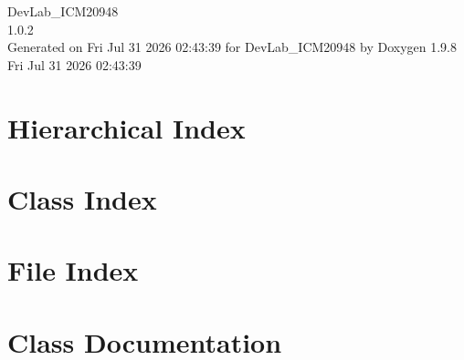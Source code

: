 \documentclass[twoside]{book}
\newcommand{\+}{\discretionary{\mbox{\scriptsize$\hookleftarrow$}}{}{}}
\newcommand{\clearemptydoublepage}{%
    \newpage{\pagestyle{empty}\cleardoublepage}%
  }
\begin{document}
  \raggedbottom
    \hypersetup{pageanchor=false,
                bookmarksnumbered=true,
                pdfencoding=unicode
               }
  \begin{titlepage}
  \vspace*{7cm}
  \begin{center}%
  {\Large Dev\+Lab\+\_\+\+ICM20948}\\
  [1ex]\large 1.\+0.\+2 \\
  \vspace*{1cm}
  {\large Generated on Fri Jul 31 2026 02\+:43\+:39 for Dev\+Lab\+\_\+\+ICM20948 by Doxygen 1.9.8}\\
    \vspace*{0.5cm}
    {\small Fri Jul 31 2026 02:43:39}
  \end{center}
  \end{titlepage}
  \clearemptydoublepage
  \tableofcontents
  \clearemptydoublepage
  \hypersetup{pageanchor=true}

\chapter{Hierarchical Index}

\chapter{Class Index}

\chapter{File Index}

\chapter{Class Documentation}










\end{document}
